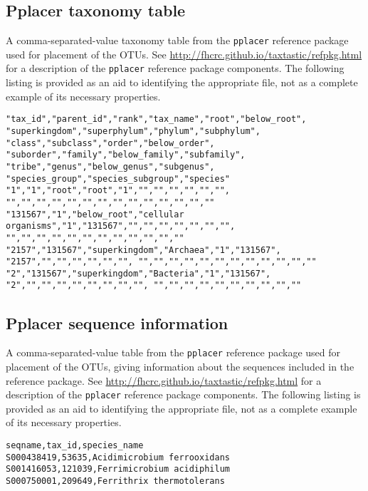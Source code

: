 \documentclass[12pt]{report}
\begin{document}
\subsection{Pplacer taxonomy table}\label{pplacer_taxa_table}
A comma-separated-value taxonomy table from the \texttt{pplacer}
reference package used for placement of the OTUs. See
\url{http://fhcrc.github.io/taxtastic/refpkg.html} for a description
of the \texttt{pplacer} reference package components. The following
listing is provided as an aid to identifying the appropriate file, not
as a complete example of its necessary properties.

\begin{lstlisting}[caption=Beginning of an example taxonomy table file]
"tax_id","parent_id","rank","tax_name","root","below_root", "superkingdom","superphylum","phylum","subphylum", "class","subclass","order","below_order", "suborder","family","below_family","subfamily", "tribe","genus","below_genus","subgenus", "species_group","species_subgroup","species"
"1","1","root","root","1","","","","","","", "","","","","","","","","","","","","",""
"131567","1","below_root","cellular organisms","1","131567","","","","","","","", "","","","","","","","","","","",""
"2157","131567","superkingdom","Archaea","1","131567", "2157","","","","","","", "","","","","","","","","","","",""
"2","131567","superkingdom","Bacteria","1","131567", "2","","","","","","","","", "","","","","","","","","",""
\end{lstlisting}

\subsection{Pplacer sequence information}\label{pplacer_seq_info}
A comma-separated-value table from the \texttt{pplacer}
reference package used for placement of the OTUs, giving information
about the sequences included in the reference package. See
\url{http://fhcrc.github.io/taxtastic/refpkg.html} for a description
of the \texttt{pplacer} reference package components.
The following
listing is provided as an aid to identifying the appropriate file, not
as a complete example of its necessary properties.
\begin{lstlisting}[caption=Beginning of an example sequence information file]
seqname,tax_id,species_name
S000438419,53635,Acidimicrobium ferrooxidans
S001416053,121039,Ferrimicrobium acidiphilum
S000750001,209649,Ferrithrix thermotolerans
\end{lstlisting}
\end{document}
